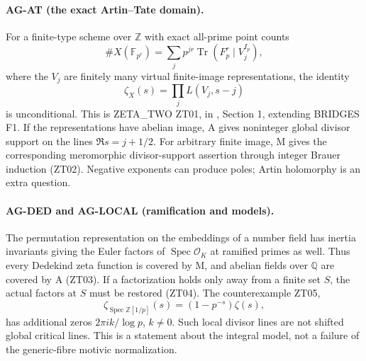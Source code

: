 \documentclass[11pt,a4paper]{article}
\begin{document}
\paragraph{AG-AT (the exact Artin--Tate domain).}
For a finite-type scheme over $\mathbb Z$ with exact all-prime point counts
\[
 \#X(\mathbb F_{p^r})=
 \sum_j p^{jr}\operatorname{Tr}(F_p^r\mid V_j^{I_p}),
\]
where the $V_j$ are finitely many virtual finite-image representations,
the identity
\[
 \zeta_X(s)=\prod_j L(V_j,s-j)
\]
is unconditional. This is ZETA\_TWO ZT01, in
, Section 1,
extending BRIDGES F1. If the representations have abelian image, A gives
noninteger global divisor support on the lines $\Re s=j+1/2$.
For arbitrary finite image, M gives the corresponding meromorphic
divisor-support assertion through integer Brauer induction (ZT02).
Negative exponents can produce poles; Artin holomorphy is an extra question.

\paragraph{AG-DED and AG-LOCAL (ramification and models).}
The permutation representation on the embeddings of a number field has
inertia invariants giving the Euler factors of $\operatorname{Spec}\mathcal
O_K$ at ramified primes as well. Thus every Dedekind zeta function is covered
by M, and abelian fields over $\mathbb Q$ are covered by A (ZT03).
If a factorization holds only away from a finite set $S$, the actual factors
at $S$ must be restored (ZT04). The counterexample ZT05,
\[
 \zeta_{\operatorname{Spec}\mathbb Z[1/p]}(s)
       =(1-p^{-s})\zeta(s),
\]
has additional zeros $2\pi i k/\log p$, $k\ne0$. Such local divisor lines
are not shifted global critical lines. This is a statement about the
integral model, not a failure of the generic-fibre motivic normalization.
\end{document}
